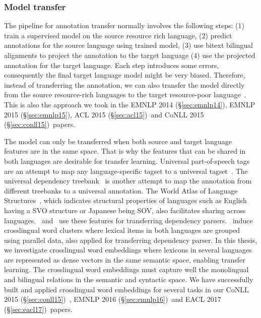 \documentclass[12pt,twoside,final,hidelinks]{ltthesis}
\theoremstyle{definition}
\newcommand\emnlpiv{EMNLP 2014 (\S\ref{sec:emnlp14})}
\newcommand\conllv{CoNLL 2015 (\S\ref{sec:conll15})}
\newcommand\aclv{ACL 2015 (\S\ref{sec:acl15})}
\newcommand\emnlpv{EMNLP 2015 (\S\ref{sec:emnlp15})}
\newcommand\emnlpvi{EMNLP 2016 (\S\ref{sec:emnlp16})}
\newcommand\eaclvii{EACL 2017 (\S\ref{sec:eacl17})}
\begin{document}
\subsubsection{Model transfer}
The pipeline for annotation transfer normally involves the following steps: (1) train a supervised model on the source resource rich language, (2) predict annotations 
for the source language using trained model, (3) use bitext bilingual alignments to project the annotation to the target language 
(4) use the projected annotation for the target language. Each step introduces some 
errors, consequently the final target language model might be very biased. Therefore, instead 
of transferring the annotation, we can also transfer the model directly from the source 
resource-rich languages to the target resource-poor language~\cite{Zeman08cross-languageparser,P14-1126}. This is also the approach we took in the \emnlpiv, \emnlpv, \aclv\ and \conllv\ papers.

The model can only be transferred when both source and target language features are in the same space. 
That is why the features that can be shared in both languages are desirable for transfer learning. Universal part-of-speech tags are an attempt to map any language-specific tagset to a universal tagset~\cite{UniversalTagSet}. The universal dependency treebank~\cite{11234/1-1699} is another attempt to 
map the annotation from different treebanks to a universal annotation. The World Atlas of 
Language Structures~\cite{wals}, which indicates structural properties of languages such as 
English having a SVO structure or Japanese being SOV, also facilitates sharing across 
languages.~ and~ use these 
features for transferring dependency parsers.~ induce crosslingual 
word clusters where lexical items in both languages are grouped using parallel data, also applied for transferring dependency parser. In this thesis, we 
investigate crosslingual word embeddings where lexicons in several languages are represented 
as dense vectors in the same semantic space, enabling transfer learning. The crosslingual word 
embeddings must capture well the monolingual and bilingual relations in the semantic and 
syntactic space. We have successfully built and applied crosslingual word embeddings for several 
tasks in our \conllv\ , \emnlpvi\ and \eaclvii\ papers. 
\end{document}
